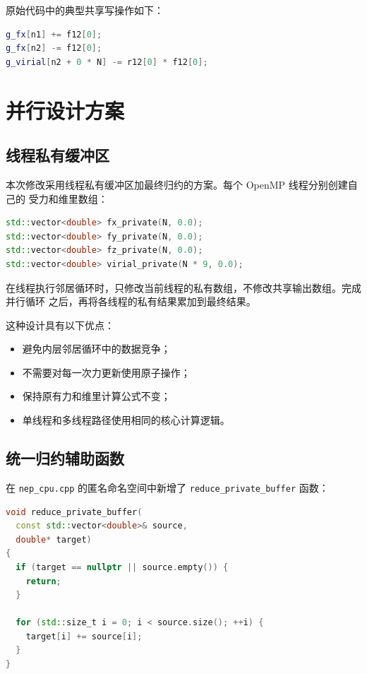 \documentclass[11pt,a4paper,fontset=fandol]{ctexart}
\begin{document}
原始代码中的典型共享写操作如下：

\begin{lstlisting}[language=C++]
g_fx[n1] += f12[0];
g_fx[n2] -= f12[0];
g_virial[n2 + 0 * N] -= r12[0] * f12[0];
\end{lstlisting}

\section{并行设计方案}

\subsection{线程私有缓冲区}

本次修改采用线程私有缓冲区加最终归约的方案。每个 OpenMP 线程分别创建自己的
受力和维里数组：

\begin{lstlisting}[language=C++]
std::vector<double> fx_private(N, 0.0);
std::vector<double> fy_private(N, 0.0);
std::vector<double> fz_private(N, 0.0);
std::vector<double> virial_private(N * 9, 0.0);
\end{lstlisting}

在线程执行邻居循环时，只修改当前线程的私有数组，不修改共享输出数组。完成并行循环
之后，再将各线程的私有结果累加到最终结果。

这种设计具有以下优点：
\begin{itemize}
  \item 避免内层邻居循环中的数据竞争；
  \item 不需要对每一次力更新使用原子操作；
  \item 保持原有力和维里计算公式不变；
  \item 单线程和多线程路径使用相同的核心计算逻辑。
\end{itemize}

\subsection{统一归约辅助函数}

在 \texttt{nep\_cpu.cpp} 的匿名命名空间中新增了
\texttt{reduce\_private\_buffer} 函数：

\begin{lstlisting}[language=C++]
void reduce_private_buffer(
  const std::vector<double>& source,
  double* target)
{
  if (target == nullptr || source.empty()) {
    return;
  }

  for (std::size_t i = 0; i < source.size(); ++i) {
    target[i] += source[i];
  }
}
\end{lstlisting}
\end{document}
